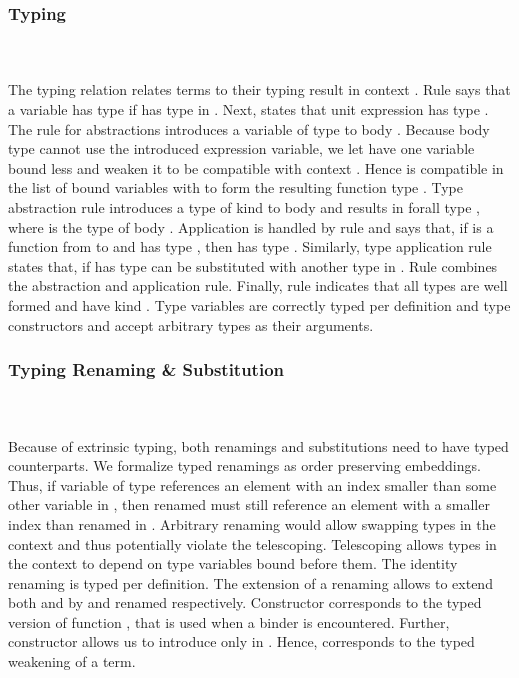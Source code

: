\subsubsection{Typing}\hfill\\\\
The typing relation    \Data{:}  relates terms  to their typing result  in context .
\FTyping
Rule  says that a variable   has type  if  has type  in . Next,  states that unit expression  has type . 
The rule for abstractions  introduces a variable of type  to body . 
Because body type  cannot use the introduced expression variable, we let  have one variable bound less and weaken it to be compatible with context   . 
Hence  is compatible in the list of bound variables with  to form the resulting function type   . 
Type abstraction rule  introduces a type of kind  to body  and results in forall type  , where  is the type of body . 
Application is handled by rule  and says that, if  is a function from  to  and  has type , then    has type . Similarly, type application rule  states that, if  has type    can be substituted with another type  in . 
Rule  combines the abstraction and application rule.
Finally, rule  indicates that all types  are well formed and have kind . Type variables are correctly typed per definition and type constructors  and  accept arbitrary types as their arguments.

\subsubsection{Typing Renaming \& Substitution}\hfill\\\\
Because of extrinsic typing, both renamings and substitutions need to have typed counterparts.
We formalize typed renamings  as order preserving embeddings. 
Thus, if variable  of type    references an element with an index smaller than some other variable  in , then renamed  must still reference an element with a smaller index than renamed  in .
Arbitrary renaming would allow swapping types in the context and thus potentially violate the telescoping. Telescoping allows types in the context to depend on type variables bound before them.
\FRenTyping
The identity renaming  is typed per definition. The extension of a renaming  allows to extend both  and  by  and renamed  respectively. Constructor  corresponds to the typed version of function , that is used when a binder is encountered. Further, constructor  allows us to introduce  only in . Hence,  corresponds to the typed weakening of a term.

